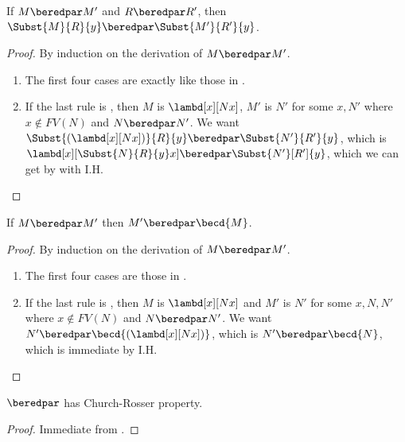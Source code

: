 \documentclass[../../../include/open-logic-section]{subfiles}
\begin{document}
\begin{lem}
  If $M \beredpar M'$ and $R \beredpar R'$, then $\Subst{M}{R}{y}
  \beredpar \Subst{M'}{R'}{y}$.
\end{lem}
\begin{proof}
  By induction on the derivation of $M \beredpar M'$.
  \begin{enumerate}
    \item The first four cases are exactly like those in
      .
    \item If the last rule is , then $M$ is
      $\lambd[x][Nx]$, $M'$ is $N'$ for some $x, N'$ where $x \notin
      FV(N)$ and $N \beredpar N'$. We want
      $\Subst{(\lambd[x][Nx])}{R}{y} \beredpar \Subst{N'}{R'}{y}$,
      which is $\lambd[x][\Subst{N}{R}{y} x] \beredpar
      \Subst{N'}[R']{y}$, which we can get by  with I.H.
  \end{enumerate}
\end{proof}

\begin{lem}
  If $M \beredpar M'$ then $M' \beredpar \becd{M}$.
\end{lem}
\begin{proof}
  By induction on the derivation of $M \beredpar M'$.
  \begin{enumerate}
    \item The first four cases are those in .
    \item If the last rule is , then $M$ is
      $\lambd[x][Nx]$ and $M'$ is $N'$ for some $x,N,N'$ where $x
      \notin FV(N)$ and $N \beredpar N'$. We want $N' \beredpar
      \becd{(\lambd[x][Nx])}$, which is $N' \beredpar \becd{N}$, which
      is immediate by I.H.
  \end{enumerate}
\end{proof}

\begin{thm}
  $\beredpar$ has Church-Rosser property.
\end{thm}
\begin{proof}
  Immediate from .
\end{proof}
\end{document}
